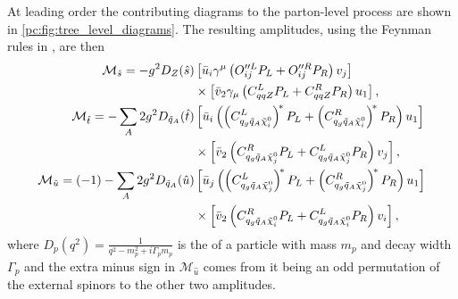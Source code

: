 \documentclass[../main.tex]{subfiles}
\begin{document}
At leading order the contributing diagrams to the parton-level process are shown in \cref{pc:fig:tree_level_diagrams}.
The resulting amplitudes, using the Feynman rules in , are then
\begin{subequations}
  \begin{align}
    \nonumber
    \M_{\hat{s}} = -g^2 D_Z(\hat{s})                         & \bclosed{ \bar{u}_i\gamma^\mu\pclosed{O^{\prime\prime L}_{ij}P_L + O^{\prime\prime R}_{ij}P_R} v_j }                                              \\
    \label{part:eq:Ms}
                                                             & \times \bclosed{ \bar{v}_2 \gamma_\mu \pclosed{C^L_{qqZ}P_L + C^R_{qqZ}P_R} u_1 },                                                                \\
    \nonumber
    \M_{\hat{t}} = -\sum_A 2g^2 D_{\tilde{q}_A}(\hat{t})     & \bclosed{ \bar{u}_i \pclosed{\pclosed{C_{q_g \tilde{q}_A \nino[i]}^L}^{\!\ast} P_L + \pclosed{C_{q_g \tilde{q}_A \nino[i]}^R}^{\!\ast} P_R} u_1 } \\
    \label{part:eq:Mt}
                                                             & \times \bclosed{ \bar{v}_2 \pclosed{C_{q_g \tilde{q}_A \nino[j]}^R P_L + C_{q_g \tilde{q}_A \nino[j]}^L P_R} v_j },                               \\
    \nonumber
    \M_{\hat{u}} = (-1)-\sum_A 2g^2 D_{\tilde{q}_A}(\hat{u}) & \bclosed{ \bar{u}_j \pclosed{\pclosed{C_{q_g \tilde{q}_A \nino[j]}^L}^{\!\ast} P_L + \pclosed{C_{q_g \tilde{q}_A \nino[j]}^R}^{\!\ast} P_R} u_1 } \\
    \label{part:eq:Mu}
                                                             & \times \bclosed{ \bar{v}_2 \pclosed{C_{q_g \tilde{q}_A \nino[i]}^R P_L + C_{q_g \tilde{q}_A \nino[i]}^L P_R} v_i },
  \end{align}
\end{subequations}
where \(D_p(q^2) = \frac{1}{q^2 - m_p^2 + i\Gamma_p m_p}\) is the
 of a particle with mass \(m_p\) and decay
width \(\Gamma_p\) and the extra minus sign in \(\mathcal{M}_{\hat{u}}\) comes from it being an odd permutation of the external spinors to the other two amplitudes.
\\
\end{document}
